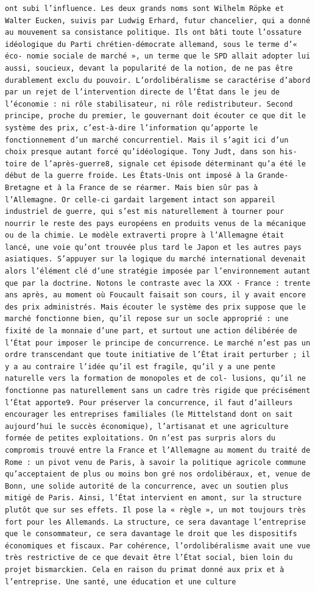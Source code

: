 \documentclass[
]{book}
\begin{document}
\begin{verbatim}
ont subi l’influence. Les deux grands noms sont Wilhelm Röpke et Walter Eucken, suivis par Ludwig Erhard, futur chancelier, qui a donné au mouvement sa consistance politique. Ils ont bâti toute l’ossature idéologique du Parti chrétien-démocrate allemand, sous le terme d’« éco- nomie sociale de marché », un terme que le SPD allait adopter lui aussi, soucieux, devant la popularité de la notion, de ne pas être durablement exclu du pouvoir. L’ordolibéralisme se caractérise d’abord par un rejet de l’intervention directe de l’État dans le jeu de l’économie : ni rôle stabilisateur, ni rôle redistributeur. Second principe, proche du premier, le gouvernant doit écouter ce que dit le système des prix, c’est-à-dire l’information qu’apporte le fonctionnement d’un marché concurrentiel. Mais il s’agit ici d’un choix presque autant forcé qu’idéologique. Tony Judt, dans son his- toire de l’après-guerre8, signale cet épisode déterminant qu’a été le début de la guerre froide. Les États-Unis ont imposé à la Grande-Bretagne et à la France de se réarmer. Mais bien sûr pas à l’Allemagne. Or celle-ci gardait largement intact son appareil industriel de guerre, qui s’est mis naturellement à tourner pour nourrir le reste des pays européens en produits venus de la mécanique ou de la chimie. Le modèle extraverti propre à l’Allemagne était lancé, une voie qu’ont trouvée plus tard le Japon et les autres pays asiatiques. S’appuyer sur la logique du marché international devenait alors l’élément clé d’une stratégie imposée par l’environnement autant que par la doctrine. Notons le contraste avec la XXX · France : trente ans après, au moment où Foucault faisait son cours, il y avait encore des prix administrés. Mais écouter le système des prix suppose que le marché fonctionne bien, qu’il repose sur un socle approprié : une fixité de la monnaie d’une part, et surtout une action délibérée de l’État pour imposer le principe de concurrence. Le marché n’est pas un ordre transcendant que toute initiative de l’État irait perturber ; il y a au contraire l’idée qu’il est fragile, qu’il y a une pente naturelle vers la formation de monopoles et de col- lusions, qu’il ne fonctionne pas naturellement sans un cadre très rigide que précisément l’État apporte9. Pour préserver la concurrence, il faut d’ailleurs encourager les entreprises familiales (le Mittelstand dont on sait aujourd’hui le succès économique), l’artisanat et une agriculture formée de petites exploitations. On n’est pas surpris alors du compromis trouvé entre la France et l’Allemagne au moment du traité de Rome : un pivot venu de Paris, à savoir la politique agricole commune qu’acceptaient de plus ou moins bon gré nos ordolibéraux, et, venue de Bonn, une solide autorité de la concurrence, avec un soutien plus mitigé de Paris. Ainsi, l’État intervient en amont, sur la structure plutôt que sur ses effets. Il pose la « règle », un mot toujours très fort pour les Allemands. La structure, ce sera davantage l’entreprise que le consommateur, ce sera davantage le droit que les dispositifs économiques et fiscaux. Par cohérence, l’ordolibéralisme avait une vue très restrictive de ce que devait être l’État social, bien loin du projet bismarckien. Cela en raison du primat donné aux prix et à l’entreprise. Une santé, une éducation et une culture 
\end{verbatim}
\end{document}
